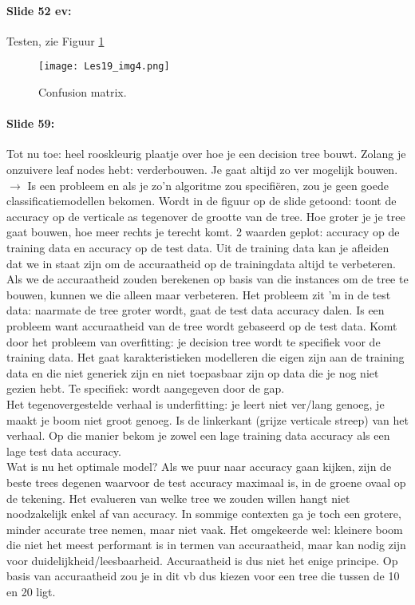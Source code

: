 \documentclass[10pt,a4paper]{report}
\begin{document}
\paragraph{Slide 52 ev:}Testen, zie Figuur \ref{19_4}

\begin{figure}[ht!]
\centering
\texttt{[image: Les19\_img4.png]}
\caption{Confusion matrix. \label{19_4}}
\end{figure}

\paragraph{Slide 59:}Tot nu toe: heel rooskleurig plaatje over hoe je een decision tree bouwt. Zolang je onzuivere leaf nodes hebt: verderbouwen. Je gaat altijd zo ver mogelijk bouwen. $\rightarrow$ Is een probleem en als je zo'n algoritme zou specifiëren, zou je geen goede classificatiemodellen bekomen. Wordt in de figuur op de slide getoond: toont de accuracy op de verticale as tegenover de grootte van de tree. Hoe groter je je tree gaat bouwen, hoe meer rechts je terecht komt. 2 waarden geplot: accuracy op de training data en accuracy op de test data. Uit de training data kan je afleiden dat we in staat zijn om de accuraatheid op de trainingdata altijd te verbeteren. Als we de accuraatheid zouden berekenen op basis van die instances om de tree te bouwen, kunnen we die alleen maar verbeteren. Het probleem zit 'm in de test data: naarmate de tree groter wordt, gaat de test data accuracy dalen. Is een probleem want accuraatheid van de tree wordt gebaseerd op de test data.
Komt door het probleem van overfitting: je decision tree wordt te specifiek voor de training data. Het gaat karakteristieken modelleren die eigen zijn aan de training data en die niet generiek zijn en niet toepasbaar zijn op data die je nog niet gezien hebt. Te specifiek: wordt aangegeven door de gap.\\
Het tegenovergestelde verhaal is underfitting: je leert niet ver/lang genoeg, je maakt je boom niet groot genoeg. Is de linkerkant (grijze verticale streep) van het verhaal. Op die manier bekom je zowel een lage training data accuracy als een lage test data accuracy. \\
Wat is nu het optimale model? Als we puur naar accuracy gaan kijken, zijn de beste trees degenen waarvoor de test accuracy maximaal is, in de groene ovaal op de tekening. Het evalueren van welke tree we zouden willen hangt niet noodzakelijk enkel af van accuracy. In sommige contexten ga je toch een grotere, minder accurate tree nemen, maar niet vaak. Het omgekeerde wel: kleinere boom die niet het meest performant is in termen van accuraatheid, maar kan nodig zijn voor duidelijkheid/leesbaarheid.
Accuraatheid is dus niet het enige principe. Op basis van accuraatheid zou je in dit vb dus kiezen voor een tree die tussen de 10 en 20 ligt.
\end{document}
